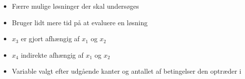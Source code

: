 \documentclass[smaller]{beamer}
\newcommand{\vertex}{\node[vertex]}
\def\Arrow{{\scalebox{2}{$\Rightarrow$}}}
\begin{document}
\begin{frame}
\begin{columns}[T]
\begin{column}[T]{.55\textwidth}
\begin{itemize}[<+->]
\item Færre mulige løsninger der skal undersøges
\item Bruger lidt mere tid på at evaluere en løsning
\item $x_3$ er gjort afhængig af $x_1$ og $x_2$
\item $x_4$ indirekte afhængig af $x_1$ og $x_2$
\item Variable valgt efter udgående kanter og antallet af betingelser den optræder i
\end{itemize}
\end{column}


 
\end{columns}

\end{frame}
\end{document}
